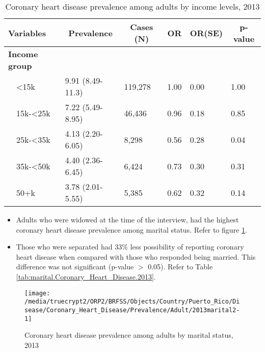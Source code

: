 \begin{table}[H]
\caption{Coronary heart disease prevalence  among adults by income levels, 2013\label{tab:income.Coronary_Heart_Disease.2013}} 
\begin{center}
\begin{tabular}{llllll}
\hline\hline
\multicolumn{1}{l}{Variables}&\multicolumn{1}{c}{Prevalence}&\multicolumn{1}{c}{Cases (N)}&\multicolumn{1}{c}{OR}&\multicolumn{1}{c}{OR(SE)}&\multicolumn{1}{c}{p-value}\tabularnewline
\hline
{\bfseries Income group}&&&&&\tabularnewline
~~\textless15k&9.91 (8.49-11.3)&119,278&1.00&0.00&1.00\tabularnewline
~~15k-\textless25k&7.22 (5.49-8.95)& 46,436&0.96&0.18&0.85\tabularnewline
~~25k-\textless35k&4.13 (2.20-6.05)&  8,298&0.56&0.28&0.04\tabularnewline
~~35k-\textless50k&4.40 (2.36-6.45)&  6,424&0.73&0.30&0.31\tabularnewline
~~50+k&3.78 (2.01-5.55)&  5,385&0.62&0.32&0.14\tabularnewline
\hline
\end{tabular}\end{center}

\end{table}

 \newpage
\begin{itemize}

\item Adults who were 
widowed at the time of the interview, had the highest coronary heart disease prevalence among marital status. Refer to figure \ref{fig:marital.Coronary_Heart_Disease.2013}.

\item Those who were separated had 33\% less possibility of reporting coronary heart disease when compared with those who responded being married. This difference was not significant (p-value $>$ 0.05). Refer to Table \ref{tab:marital.Coronary_Heart_Disease.2013}.

\end{itemize}

\begin{figure}[H]
\caption{Coronary heart disease prevalence among adults by marital status,
         2013}
\label{fig:marital.Coronary_Heart_Disease.2013}
\begin{knitrout}
\color{fgcolor}

{\centering \texttt{[image: /media/truecrypt2/ORP2/BRFSS/Objects/Country/Puerto\_Rico/Disease/Coronary\_Heart\_Disease/Prevalence/Adult/2013marital2-1]} 

}



\end{knitrout}
 \end{figure}

